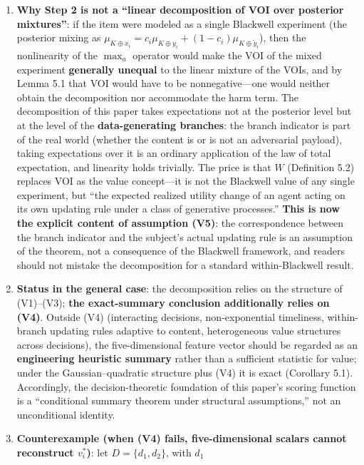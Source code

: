 \documentclass[
  11pt]{article}
\providecommand{\tightlist}{%
  \setlength{\itemsep}{0pt}\setlength{\parskip}{0pt}}
\begin{document}
\begin{enumerate}
\def\labelenumi{\arabic{enumi}.}
\tightlist
\item
  \textbf{Why Step 2 is not a ``linear decomposition of VOI over
  posterior mixtures''}: if the item were modeled as a single Blackwell
  experiment (the posterior mixing as
  \(\mu_{K\oplus x_i} = c_i\mu_{K\oplus y_i} + (1-c_i)\mu_{K\oplus\tilde y_i}\)),
  then the nonlinearity of the \(\max_a\) operator would make the VOI of
  the mixed experiment \textbf{generally unequal} to the linear mixture
  of the VOIs, and by Lemma 5.1 that VOI would have to be
  nonnegative---one would neither obtain the decomposition nor
  accommodate the harm term. The decomposition of this paper takes
  expectations not at the posterior level but at the level of the
  \textbf{data-generating branches}: the branch indicator is part of the
  real world (whether the content is or is not an adversarial payload),
  taking expectations over it is an ordinary application of the law of
  total expectation, and linearity holds trivially. The price is that
  \(W\) (Definition 5.2) replaces VOI as the value concept---it is not
  the Blackwell value of any single experiment, but ``the expected
  realized utility change of an agent acting on its own updating rule
  under a class of generative processes.'' \textbf{This is now the
  explicit content of assumption (V5)}: the correspondence between the
  branch indicator and the subject's actual updating rule is an
  assumption of the theorem, not a consequence of the Blackwell
  framework, and readers should not mistake the decomposition for a
  standard within-Blackwell result.
\item
  \textbf{Status in the general case}: the decomposition relies on the
  structure of (V1)--(V3); \textbf{the exact-summary conclusion
  additionally relies on (V4)}. Outside (V4) (interacting decisions,
  non-exponential timeliness, within-branch updating rules adaptive to
  content, heterogeneous value structures across decisions), the
  five-dimensional feature vector should be regarded as an
  \textbf{engineering heuristic summary} rather than a sufficient
  statistic for value; under the Gaussian--quadratic structure plus (V4)
  it is exact (Corollary 5.1). Accordingly, the decision-theoretic
  foundation of this paper's scoring function is a ``conditional summary
  theorem under structural assumptions,'' not an unconditional identity.
\item
  \textbf{Counterexample (when (V4) fails, five-dimensional scalars
  cannot reconstruct \(v_i^*\))}: let \(D = \{d_1, d_2\}\), with \(d_1\)

\end{enumerate}
\end{document}
